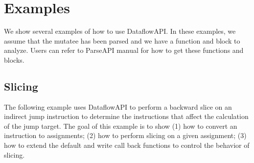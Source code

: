 \section{Examples}
\label{sec:examples}
We show several examples of how to use DataflowAPI. In these examples, we assume
that the mutatee has been parsed and we have a function and block to analyze.
Users can refer to ParseAPI manual for how to get these functions and blocks.

\subsection{Slicing}
The following example uses DataflowAPI to perform a backward slice on an
indirect jump instruction to determine the instructions that affect the
calculation of the jump target. The goal of this example is to show (1) how to
convert an instruction to assignments; (2) how to perform slicing on a given
assignment; (3) how to extend the default  and write
call back functions to control the behavior of slicing.

